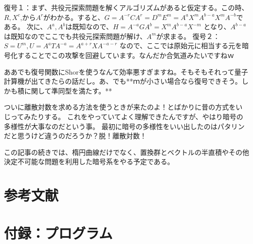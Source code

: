 \documentclass[
]{article}
\begin{document}
復号１：まず、共役元探索問題を解くアルゴリズムがあると仮定する。この時、
    $R,X^c$,から$A^r$がわかる。すると、$G=A^{-r}CA^{r}=D^mE^m=A^aX^mA^{b-a}X^mA^{-b}$である。
    次に、$A^a,A^b$は既知なので、$H=A^{-a}GA^b=X^mA^{b-a}X^{-m}$
    となり、$A^{b-a}$は既知なのでここでも共役元探索問題が解け、$A^m$が求まる。
復号２：$S=U^m,U=A^aTA^{-a}=A^{a+r}XA^{-a-r}$
なので、ここでは原始元に相当する元を暗号化することでこの攻撃を回避しています。なんだか合気道みたいですねｗ

ああでも復号関数にShorを使うなんて効率悪すぎますね。そもそもそれって量子計算機が出てきたらの話だし。あ、でも**ｍが小さい場合なら復号できそう。しかも積に関して準同型を満たす。**

ついに離散対数を求める方法を使うときが来たのよ！とばかりに昔の方式をいじってみたりする。
これをやっていてよく理解できたんですが、やはり暗号の多様性が大事なのだという事。
最初に暗号の多様性をいい出したのはパタリンだと思うけど違うのだろうか？脱！離散対数！

この記事の続きでは、楕円曲線だけでなく、置換群とベクトルの半直積やその他決定不可能な問題を利用した暗号系をやる予定である。

\hypertarget{ux53c2ux8003ux6587ux732e}{%
\section{参考文献}\label{ux53c2ux8003ux6587ux732e}}

\hypertarget{ux4ed8ux9332ux30d7ux30edux30b0ux30e9ux30e0}{%
\section{付録：プログラム}\label{ux4ed8ux9332ux30d7ux30edux30b0ux30e9ux30e0}}
\end{document}
